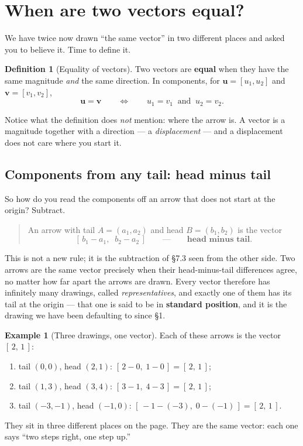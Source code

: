 \documentclass[11pt]{article}
\theoremstyle{definition}
\newtheorem{defn}{Definition}
\newtheorem{ex}{Example}
\theoremstyle{remark}
\newcommand{\vc}[1]{\mathbf{#1}}
\begin{document}
\section{When are two vectors equal?}
We have twice now drawn ``the same vector'' in two different places and asked
you to believe it. Time to define it.

\begin{defn}[Equality of vectors]
Two vectors are \textbf{equal} when they have the same magnitude \emph{and} the
same direction. In components, for $\vc{u}=[u_1,u_2]$ and $\vc{v}=[v_1,v_2]$,
\[
  \vc{u}=\vc{v}
  \qquad\Longleftrightarrow\qquad
  u_1=v_1 \;\;\text{and}\;\; u_2=v_2 .
\]
\end{defn}

\noindent Notice what the definition does \emph{not} mention: where the arrow
is. A vector is a magnitude together with a direction --- a
\emph{displacement} --- and a displacement does not care where you start it.

\subsection*{Components from any tail: head minus tail}
So how do you read the components off an arrow that does not start at the
origin? Subtract.

\begin{quote}
An arrow with tail $A=(a_1,a_2)$ and head $B=(b_1,b_2)$ is the vector
\[
  [\,b_1-a_1,\;\;b_2-a_2\,]
  \qquad\text{---}\qquad
  \textbf{head minus tail}.
\]
\end{quote}

\noindent This is not a new rule; it is the subtraction of \S7.3 seen from the
other side. Two arrows are the same vector precisely when their
head-minus-tail differences agree, no matter how far apart the arrows are
drawn. Every vector therefore has infinitely many drawings, called
\emph{representatives}, and exactly one of them has its tail at the origin ---
that one is said to be in \textbf{standard position}, and it is the drawing we
have been defaulting to since \S1.

\begin{ex}[Three drawings, one vector]
Each of these arrows is the vector $[\,2,\,1\,]$:
\begin{enumerate}[label=(\roman*),leftmargin=2.4em,itemsep=2pt,topsep=3pt]
  \item tail $(0,0)$, head $(2,1)$: \quad $[\,2-0,\;1-0\,]=[\,2,\,1\,]$;
  \item tail $(1,3)$, head $(3,4)$: \quad $[\,3-1,\;4-3\,]=[\,2,\,1\,]$;
  \item tail $(-3,-1)$, head $(-1,0)$: \quad $[\,-1-(-3),\;0-(-1)\,]=[\,2,\,1\,]$.
\end{enumerate}
They sit in three different places on the page. They are the same vector: each
one says ``two steps right, one step up.''
\end{ex}
\end{document}
